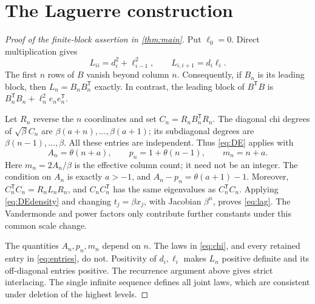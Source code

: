 \documentclass[10pt]{amsart}
\newcommand{\T}{\mathsf T}
\begin{document}
\section{The Laguerre construction}
\begin{proof}[Proof of the finite-block assertion in \cref{thm:main}]
Put $\ell_0=0$. Direct multiplication gives
\begin{equation}\label{eq:entries}
 L_{ii}=d_i^2+\ell_{i-1}^2,\qquad L_{i,i+1}=d_i\ell_i.
\end{equation}
The first $n$ rows of $B$ vanish beyond column $n$. Consequently,
if $B_n$ is its leading block, then $L_n=B_nB_n^\T$ exactly.
In contrast, the leading block of $B^\T B$ is
$B_n^\T B_n+\ell_n^2 e_ne_n^\T$.

Let $R_n$ reverse the $n$ coordinates and set
$C_n=R_nB_n^\T R_n$. The diagonal chi degrees of $\sqrt\beta C_n$
are $\beta(a+n),\ldots,\beta(a+1)$; its subdiagonal degrees are
$\beta(n-1),\ldots,\beta$. All these entries are independent.
Thus \eqref{eq:DE} applies with
\begin{equation}\label{eq:parameters}
 A_n=\theta(n+a),\qquad p_n=1+\theta(n-1),\qquad m_n=n+a.
\end{equation}
Here $m_n=2A_n/\beta$ is the effective column count; it need not be
an integer. The condition on $A_n$ is exactly $a>-1$, and
$A_n-p_n=\theta(a+1)-1$. Moreover,
$C_n^\T C_n=R_nL_nR_n$, and $C_nC_n^\T$ has the same eigenvalues
as $C_n^\T C_n$. Applying \eqref{eq:DEdensity} and changing
$t_j=\beta x_j$, with Jacobian $\beta^n$, proves \eqref{eq:lag}.
The Vandermonde and power factors only contribute further constants
under this common scale change.

The quantities $A_n,p_n,m_n$ depend on $n$. The laws in \eqref{eq:chi},
and every retained entry in \eqref{eq:entries}, do not. Positivity of
$d_i,\ell_i$ makes $L_n$ positive definite and its off-diagonal
entries positive. The recurrence argument above gives strict
interlacing. The single infinite sequence defines all joint laws,
which are consistent under deletion of the highest levels.
\end{proof}
\end{document}
